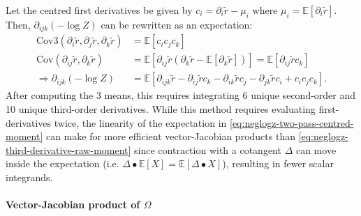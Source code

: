\documentclass{article}
\begin{document}
Let the centred first derivatives be given by $c_{i} = \partial_{i} \tilde{r} - \mu_{i}$ where $\mu_{i} = \mathbb{E}[\partial_{i} \tilde{r}]$.
Then, $\partial_{ijk}(-\log Z)$ can be rewritten as an expectation:
%
\begin{align}
  \mathrm{Cov3}(\partial_{i} \tilde{r}, \partial_{j} \tilde{r}, \partial_{k} \tilde{r}) & = \mathbb{E}[c_{i} c_{j} c_{k}]                                                                                                                                                                           \\
  \mathrm{Cov}(\partial_{ij} \tilde{r}, \partial_{k} \tilde{r})                         & = \mathbb{E}[\partial_{ij} \tilde{r} (\partial_{k} \tilde{r} - \mathbb{E}[\partial_{k} \tilde{r}])] = \mathbb{E}[\partial_{ij} \tilde{r} c_{k}]                                                           \\
  \Rightarrow \partial_{ijk} (-\log Z)                                                  & = \mathbb{E} [ \partial_{ijk} \tilde{r} - \partial_{ij} \tilde{r} c_{k} - \partial_{ik} \tilde{r} c_{j} - \partial_{jk} \tilde{r} c_{i} + c_{i} c_{j} c_{k} ]. \label{eq:neglogz-two-pass-centred-moment}
\end{align}
%
After computing the 3 means, this requires integrating 6 unique second-order and 10 unique third-order derivatives.
While this method requires evaluating first-derivatives twice, the linearity of the expectation in \cref{eq:neglogz-two-pass-centred-moment} can make for more efficient vector-Jacobian products than \cref{eq:neglogz-third-derivative-raw-moment} since contraction with a cotangent $\Delta$ can move inside the expectation (i.e. $\Delta \bullet \mathbb{E}[X] = \mathbb{E}[\Delta \bullet X]$), resulting in fewer scalar integrands.

\paragraph{Vector-Jacobian product of $\Omega$}
\end{document}
